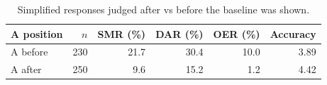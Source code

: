 \begin{table}[H]
\caption{Simplified responses judged after vs before the baseline was shown.}
\label{tab:sens:Abefore}
\centering
\begin{tabular}{lrrrrr}
\toprule
A position & $n$ & SMR (\%) & DAR (\%) & OER (\%) & Accuracy \\
\midrule
A before & 230 & 21.7 & 30.4 & 10.0 & 3.89 \\
A after & 250 & 9.6 & 15.2 & 1.2 & 4.42 \\
\bottomrule
\end{tabular}
\end{table}
